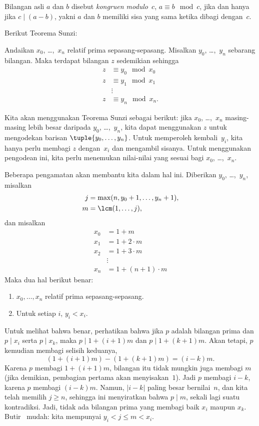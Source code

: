 \documentclass[../../../include/open-logic-section]{subfiles}
\begin{document}
\begin{defn}
Bilangan asli $a$ dan $b$ disebut \emph{kongruen modulo~$c$},
$a \equiv b \mod c$, jika dan hanya jika $c \mid (a-b)$, yakni $a$ dan $b$
memiliki sisa yang sama ketika dibagi dengan~$c$.
\end{defn}

Berikut Teorema Sunzi:
\begin{thm}
Andaikan $x_0$, \dots,~$x_n$ relatif prima sepasang-sepasang. Misalkan
$y_0$, \dots,~$y_n$ sebarang bilangan. Maka terdapat bilangan $z$ sedemikian
sehingga
\begin{align*}
z & \equiv y_0 \mod x_0 \\
z & \equiv y_1 \mod x_1 \\
& \vdots  \\
z & \equiv y_n \mod x_n.
\end{align*}
\end{thm}

Kita akan menggunakan Teorema Sunzi sebagai berikut: jika $x_0$,
\dots,~$x_n$ masing-masing lebih besar daripada $y_0$, \dots,~$y_n$, kita
dapat menggunakan $z$ untuk mengodekan barisan $\tuple{y_0, \dots,y_n}$.
Untuk memperoleh kembali~$y_i$, kita hanya perlu membagi $z$ dengan~$x_i$
dan mengambil sisanya. Untuk menggunakan pengodean ini, kita perlu menemukan
nilai-nilai yang sesuai bagi $x_0$, \dots,~$x_n$.

Beberapa pengamatan akan membantu kita dalam hal ini. Diberikan
$y_0$, \dots,~$y_n$, misalkan
\begin{align*}
j &= \max(n, y_0 + 1, \dots, y_n + 1), \\
m &= \lcm(1,\dots,j),
\end{align*}
dan misalkan
\begin{align*}
x_0 & = 1 + m \\
x_1 & = 1 + 2 \cdot m \\
x_2 & = 1 + 3 \cdot m \\
& \vdots  \\
x_n & = 1 + (n+1) \cdot m
\end{align*}
Maka dua hal berikut benar:
\begin{enumerate}
\item{} $x_0,\dots,x_n$ relatif prima sepasang-sepasang.
\item{} Untuk setiap $i$, $y_i < x_i$.
\end{enumerate}
Untuk melihat bahwa  benar, perhatikan bahwa jika $p$ adalah
bilangan prima dan $p \mid x_i$ serta $p \mid x_k$, maka
$p \mid 1 + (i+1) m$ dan $p \mid 1 + (k+1) m$. Akan tetapi, $p$ kemudian
membagi selisih keduanya,
\[
(1 + (i+1)m) - (1+ (k+1)m) = (i-k) m.
\]
Karena $p$ membagi $1 + (i+1)m$, bilangan itu tidak mungkin juga membagi $m$
(jika demikian, pembagian pertama akan menyisakan~$1$). Jadi $p$ membagi
$i-k$, karena $p$ membagi $(i-k)m$. Namun, $\left|i-k\right|$ paling besar
bernilai~$n$, dan kita telah memilih $j \geq n$, sehingga ini menyiratkan
bahwa $p \mid m$, sekali lagi suatu kontradiksi. Jadi, tidak ada bilangan
prima yang membagi baik $x_i$ maupun $x_k$. Butir~ mudah:
kita mempunyai $y_i < j \leq m < x_i$.
\end{document}
